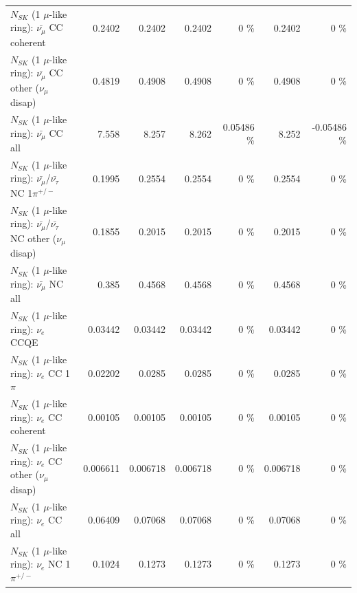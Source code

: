 \begin{table}
\begin{tabular}{| l | r | r | r  r | r  r |}
                       $N_{SK}$ (1 $\mu$-like ring): $\bar{\nu_\mu}$ CC coherent &          0.2402 &          0.2402 &          0.2402 &        0 \%  &          0.2402 &        0 \%  \\ 
        $N_{SK}$ (1 $\mu$-like ring): $\bar{\nu_\mu}$ CC other ($\nu_\mu$ disap) &          0.4819 &          0.4908 &          0.4908 &        0 \%  &          0.4908 &        0 \%  \\ 
                          $N_{SK}$ (1 $\mu$-like ring): $\bar{\nu_{\mu}}$ CC all &           7.558 &           8.257 &           8.262 &  0.05486 \%  &           8.252 & -0.05486 \%  \\ 
\hline
  $N_{SK}$ (1 $\mu$-like ring): $\bar{\nu_\mu}$/$\bar{\nu_\tau}$ NC 1$\pi^{+/-}$ &          0.1995 &          0.2554 &          0.2554 &        0 \%  &          0.2554 &        0 \%  \\ 
$N_{SK}$ (1 $\mu$-like ring): $\bar{\nu_\mu}$/$\bar{\nu_\tau}$ NC other ($\nu_\mu$ disap) &          0.1855 &          0.2015 &          0.2015 &        0 \%  &          0.2015 &        0 \%  \\ 
                          $N_{SK}$ (1 $\mu$-like ring): $\bar{\nu_{\mu}}$ NC all &           0.385 &          0.4568 &          0.4568 &        0 \%  &          0.4568 &        0 \%  \\ 
\hline
\hline
\hline
                                      $N_{SK}$ (1 $\mu$-like ring): $\nu_e$ CCQE &         0.03442 &         0.03442 &         0.03442 &        0 \%  &         0.03442 &        0 \%  \\ 
                                 $N_{SK}$ (1 $\mu$-like ring): $\nu_e$ CC 1$\pi$ &         0.02202 &          0.0285 &          0.0285 &        0 \%  &          0.0285 &        0 \%  \\ 
                               $N_{SK}$ (1 $\mu$-like ring): $\nu_e$ CC coherent &         0.00105 &         0.00105 &         0.00105 &        0 \%  &         0.00105 &        0 \%  \\ 
                $N_{SK}$ (1 $\mu$-like ring): $\nu_e$ CC other ($\nu_\mu$ disap) &        0.006611 &        0.006718 &        0.006718 &        0 \%  &        0.006718 &        0 \%  \\ 
                                  $N_{SK}$ (1 $\mu$-like ring): $\nu_{e}$ CC all &         0.06409 &         0.07068 &         0.07068 &        0 \%  &         0.07068 &        0 \%  \\ 
\hline
                           $N_{SK}$ (1 $\mu$-like ring): $\nu_e$ NC 1$\pi^{+/-}$ &          0.1024 &          0.1273 &          0.1273 &        0 \%  &          0.1273 &        0 \%  \\ 

\end{tabular}
\end{table}
